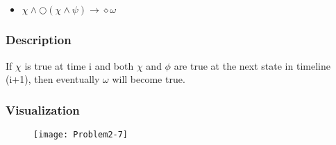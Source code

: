 \newpage
\subsection{}


\begin{itemize}
   \item[] $\chi \land \bigcirc (\chi \land \psi) \rightarrow \diamond \omega$
\end{itemize}

\subsubsection{Description}
If $\chi$ is true at time i and both $\chi$ and $\phi$ are true at the next state in timeline (i+1), then eventually $\omega$ will become true.

\subsubsection{Visualization}

\begin{figure}[h!]
	\centering \texttt{[image: Problem2-7]}
\end{figure}
